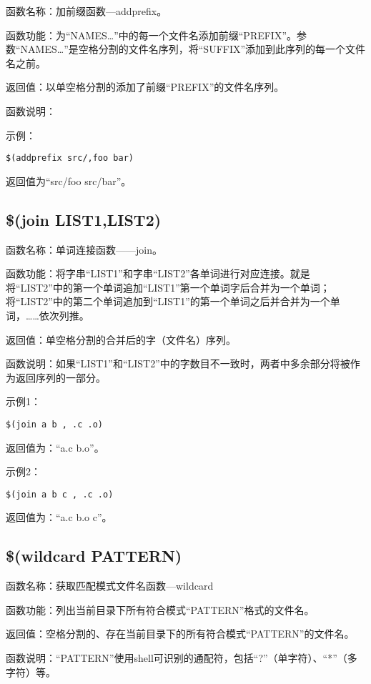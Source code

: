 函数名称：加前缀函数—addprefix。

函数功能：为“NAMES…”中的每一个文件名添加前缀“PREFIX”。参数“NAMES…”是空格分割的文件名序列，将“SUFFIX”添加到此序列的每一个文件名之前。

返回值：以单空格分割的添加了前缀“PREFIX”的文件名序列。

函数说明：

示例：

\begin{Verbatim}[]
$(addprefix src/,foo bar)
\end{Verbatim}

返回值为“src/foo src/bar”。

\subsection{\$(join LIST1,LIST2)}

函数名称：单词连接函数——join。

函数功能：将字串“LIST1”和字串“LIST2”各单词进行对应连接。就是将“LIST2”中的第一个单词追加“LIST1”第一个单词字后合并为一个单词；将“LIST2”中的第二个单词追加到“LIST1”的第一个单词之后并合并为一个单词，……依次列推。

返回值：单空格分割的合并后的字（文件名）序列。

函数说明：如果“LIST1”和“LIST2”中的字数目不一致时，两者中多余部分将被作为返回序列的一部分。

示例1：
\begin{Verbatim}[]
$(join a b , .c .o)
\end{Verbatim}

返回值为：“a.c b.o”。

示例2：
\begin{Verbatim}[]
$(join a b c , .c .o)
\end{Verbatim}

返回值为：“a.c b.o c”。

\subsection{\$(wildcard PATTERN)}

函数名称：获取匹配模式文件名函数—wildcard

函数功能：列出当前目录下所有符合模式“PATTERN”格式的文件名。

返回值：空格分割的、存在当前目录下的所有符合模式“PATTERN”的文件名。

函数说明：“PATTERN”使用shell可识别的通配符，包括“?”（单字符）、“*”（多字符）等。

